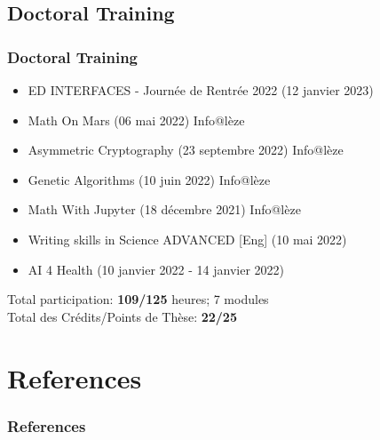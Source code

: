 \documentclass{beamer}
\begin{document}
	\subsection{Doctoral Training}
	\begin{frame}
		\frametitle{Doctoral Training}
		\begin{itemize}
			\item ED INTERFACES - Journée de Rentrée 2022 (12 janvier 2023)
			\item Math On Mars (06 mai 2022) Info@lèze
			\item Asymmetric Cryptography (23 septembre 2022) Info@lèze
			\item Genetic Algorithms (10 juin 2022) Info@lèze
			\item Math With Jupyter (18 décembre 2021) Info@lèze
			\item Writing skills in Science ADVANCED [Eng] (10 mai 2022)
			\item AI 4 Health (10 janvier 2022 - 14 janvier 2022)
		\end{itemize}
		\vspace{0.5cm}
		Total participation: \textbf{109/125} heures; 7 modules\\
		Total des Crédits/Points de Thèse: \textbf{22/25}
	\end{frame}
	
	\section{References}
	\begin{frame}[allowframebreaks]
		\frametitle{References}
		\nocite{*}
		
		
	\end{frame}
\end{document}
